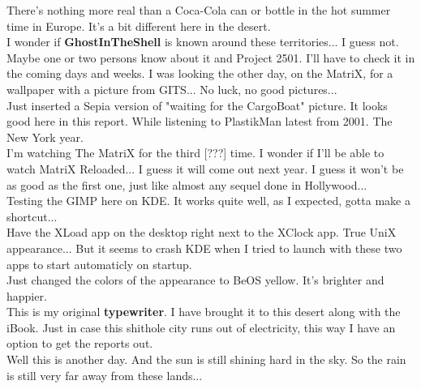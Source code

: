 \documentclass[11pt,twoside,a4paper]{book}
\begin{document}
\begin{multicols*}{2}
There's nothing more real than a Coca-Cola can or bottle in the hot summer time in Europe. It's a bit different here in the desert. ~\\

I wonder if \textbf{GhostInTheShell} is known around these territories... I guess not. Maybe one or two persons know about it and Project 2501. I'll have to check it in the coming days and weeks. I was looking the other day, on the MatriX, for a wallpaper with a picture from GITS... No luck, no good pictures... ~\\

Just inserted a Sepia version of "waiting for the CargoBoat" picture. It looks good here in this report. While listening to PlastikMan latest from 2001. The New York year. ~\\

I'm watching The MatriX for the third [???] time. I wonder if I'll be able to watch MatriX Reloaded... I guess it will come out next year. I guess it won't be as good as the first one, just like almost any sequel done in Hollywood... ~\\

Testing the GIMP here on KDE. It works quite well, as I expected, gotta make a shortcut... ~\\

Have the XLoad app on the desktop right next to the XClock app. True UniX appearance... But it seems to crash KDE when I tried to launch with these two apps to start automaticly on startup. ~\\

Just changed the colors of the appearance to BeOS yellow. It's brighter and happier. ~\\

This is my original \textbf{typewriter}. I have brought it to this desert along with the iBook. Just in case this shithole city runs out of electricity, this way I have an option to get the reports out. ~\\

Well this is another day. And the sun is still shining hard in the sky. So the rain is still very far away from these lands... ~\\

\begin{itemize}
	\setlength{\itemsep}{1pt}
	\setlength{\parskip}{0pt}
	\setlength{\parsep}{0pt}
	

\end{itemize}
\end{multicols*}
\end{document}
